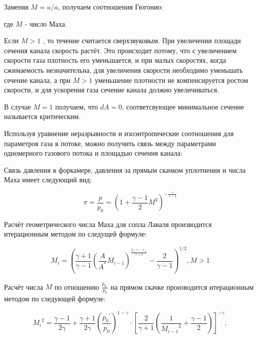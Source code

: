 \documentclass[a4paper]{article}
\begin{document}
Заменяя $M = u/a$, получаем соотношения Гюгонио:
\par
\begin{center}
\end{center}
\par
где $M$ - число Маха. \par
\vspace{0.3cm}

Если $M > 1$ , то течение считается сверхзвуковым. При увеличении площади сечения канала скорость растёт. Это происходит потому, что с увеличением скорости газа плотность его уменьшается, и при малых скоростях, когда сжимаемость незначительна, для увеличения скорости необходимо уменьшать сечение канала, а при $M > 1$ уменьшение плотности не компенсируется ростом скорости, и для ускорения газа сечение канала должно увеличиваться.

В случае $M = 1$ получаем, что $dA = 0$, соответсвующее минимальное сечение называется критическим.

Используя уравнение неразрывности и изоэнтропические соотношения для параметров газа в потоке, можно получить связь между параметрами одномерного газового потока и площадью сечения канала:





Связь давления в форкамере, давления за прямым скачком уплотнения и числа Маха имеет следующий вид:

\begin{equation}
    \label{4.9}
    \pi = \frac{p}{p_0}=(1 + \frac{\gamma - 1}{2}M^2)^{-\frac{\gamma}{\gamma - 1}}
\end{equation}

Расчёт геометрического числа Маха для сопла Лаваля производится итерационным методом по следущей формуле:

\begin{equation}
    M_i = \left( \frac{\gamma + 1}{\gamma-1} \left( \frac{A}{A^*}M_{i-1}\right)^{\frac{2(\gamma - 1)}{\gamma+1}} - \frac{2}{\gamma-1}  \right)^{1/2}, M>1 
\end{equation}


Расчёт числа $M$ по отношению $\frac{ {p_0}^{'} }{p_0}$ на прямом скачке производится итерационным методом по следующей формуле:

\begin{equation}
    {M_i}^2 = \frac{\gamma-1}{2\gamma} + \frac{\gamma+1}{2 \gamma} \left( \frac{ {p_0}^{'} }{p_0} \right)^{1-\gamma} \cdot \left[ \frac{2}{\gamma+1} \left( \frac{1}{ {M_{i-1}}^2 } + \frac{\gamma-1}{2} \right)  \right]^{-\gamma},
\end{equation}
\end{document}
